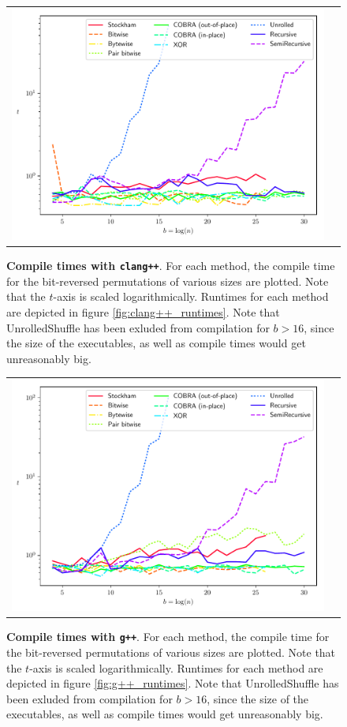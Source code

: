 ﻿\documentclass[10pt]{article}
\begin{document}
{\begin{figure}[ht!]
\centering
\begin{tabular}{cc}
  \includegraphics[width=4.5in]{results/clang++_compile_times.pdf}
\end{tabular}
\caption{{\bf Compile times with {\tt clang++}}. For each method, the
  compile time for the bit-reversed permutations of various sizes are
  plotted. Note that the $t$-axis is scaled logarithmically.  Runtimes
  for each method are depicted in figure \ref{fig:clang++_runtimes}.
  Note that UnrolledShuffle has been exluded from compilation for
  $b>16$, since the size of the executables, as well as compile times
  would get unreasonably big.
  \label{fig:clang++_compile_times}	
}
\end{figure}

\begin{figure}[ht!]
\centering
\begin{tabular}{cc}
  \includegraphics[width=4.5in]{results/g++_compile_times.pdf}
\end{tabular}
\caption{{\bf Compile times with {\tt g++}}. For each method, the
  compile time for the bit-reversed permutations of various sizes are
  plotted. Note that the $t$-axis is scaled logarithmically.  Runtimes
  for each method are depicted in figure \ref{fig:g++_runtimes}. Note
  that UnrolledShuffle has been exluded from compilation for $b>16$,
  since the size of the executables, as well as compile times would
  get unreasonably big.
  \label{fig:g++_compile_times}	
}
\end{figure}

}
\end{document}
